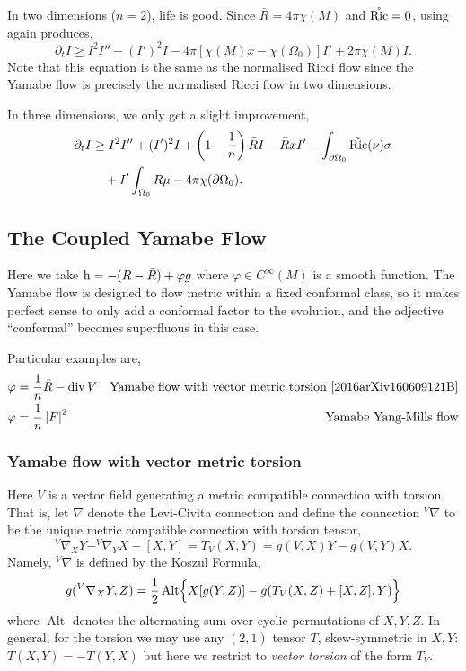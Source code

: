 \documentclass{amsart}
\begin{document}
In two dimensions (\(n=2\)), life is good. Since \(\bar{R} = 4\pi \chi(M)\) and \(\mathring{\operatorname{Ric}} = 0\), using  again produces,
\[
\partial_t I \geq I^2 I'' -  (I')^2 I - 4\pi\left[\chi(M)x - \chi(\Omega_0)\right]I' + 2\pi\chi(M) I.
\]
Note that this equation is the same as the normalised Ricci flow since the Yamabe flow is precisely the normalised Ricci flow in two dimensions.

In three dimensions, we only get a slight improvement,
\[
\begin{split}
\partial_t I &\geq I^2 I'' +  (I')^2 I + \left(1 - \frac{1}{n}\right) \bar{R} I - \bar{R}xI' - \int_{\partial {\Omega_0}} \mathring{\operatorname{Ric}} (\nu) \sigma \\
&\quad + I' \int_{\Omega_0} R \mu - 4\pi\chi(\partial {\Omega_0}).
\end{split}
\]


\subsection{The Coupled Yamabe Flow }
\label{subsec:flows_yamabe_coupled}

Here we take \(\operatorname{h} = -(R - \bar{R}) + \varphi g\) where \(\varphi \in C^{\infty}(M)\) is a smooth function. The Yamabe flow is designed to flow metric within a fixed conformal class, so it makes perfect sense to only add a conformal factor to the evolution, and the adjective ``conformal'' becomes superfluous in this case.

Particular examples are,
\begin{align*}
\varphi &= \frac{1}{n} \bar{R} - \operatorname{div} V & \text{Yamabe flow with vector metric torsion \cite{2016arXiv160609121B}} \\
\varphi &= \frac{1}{n} \left|{F}\right|^2 & \text{Yamabe Yang-Mills flow}
\end{align*}

\subsubsection*{Yamabe flow with vector metric torsion}

Here \(V\) is a vector field generating a metric compatible connection with torsion. That is, let \(\nabla\) denote the Levi-Civita connection and define the connection \(^{V}\nabla\) to be the unique metric compatible connection with torsion tensor,
\begin{equation}
\label{eq:vector_torsion}
^{V}\nabla_X Y - ^{V}\nabla_Y X - [X, Y] = T_V(X, Y) = g(V, X) Y - g(V, Y) X.
\end{equation}
Namely, \(^{V}\nabla\) is defined by the Koszul Formula,
\begin{equation}
\label{eq:koszul}
g(^{V}\nabla_X Y, Z) = \frac{1}{2} \operatorname{Alt} \Bigl\{X[g(Y, Z)] - g(T_V(X, Z) + [X, Z], Y)\Bigr\}
\end{equation}
where $\operatorname{Alt}$ denotes the alternating sum over cyclic permutations of $X, Y, Z$. In general, for the torsion we may use any \((2, 1)\) tensor \(T\), skew-symmetric in \(X, Y\): \(T(X, Y) = -T(Y, X)\) but here we restrict to \emph{vector torsion} of the form \(T_V\).
\end{document}
